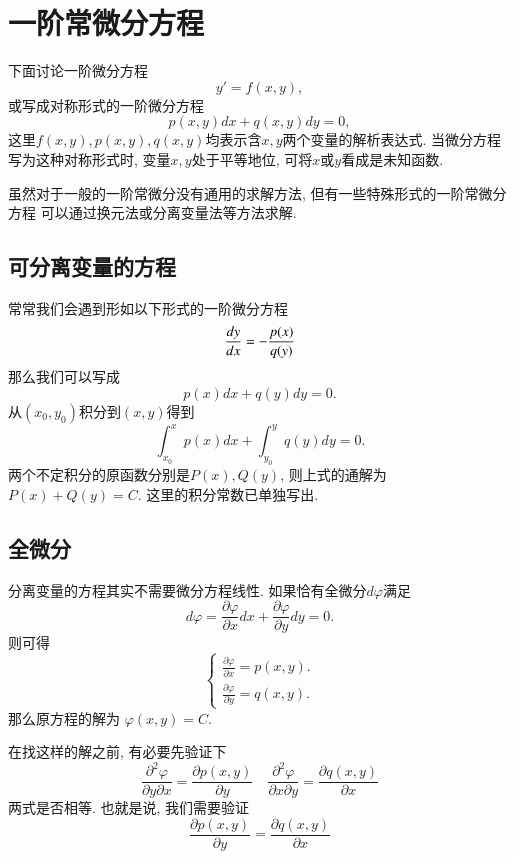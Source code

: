 \section{一阶常微分方程}
下面讨论一阶微分方程
\begin{equation}
    y' = f(x,y),
\end{equation}
或写成对称形式的一阶微分方程
\begin{equation}
    p(x,y) dx + q(x,y) dy = 0,
\end{equation}
这里$f(x,y), p(x,y), q(x,y)$均表示含$x,y$两个变量的解析表达式. 当微分方程写为这种对称形式时,
变量$x,y$处于平等地位, 可将$x$或$y$看成是未知函数.

虽然对于一般的一阶常微分没有通用的求解方法, 但有一些特殊形式的一阶常微分方程
可以通过换元法或分离变量法等方法求解. 

\subsection{可分离变量的方程}
常常我们会遇到形如以下形式的一阶微分方程
\begin{equation}
    \frac{d y}{d x}=-\frac{p(x)}{q(y)} \\
\end{equation}
那么我们可以写成
$$
p(x) d x+q(y) d y=0 . 
$$
从$(x_0, y_0)$积分到$(x, y)$得到
$$
\int_{x_0}^{x} p(x) d x+\int_{y_0}^{y} q(y) d y= 0.
$$
两个不定积分的原函数分别是$P(x), Q(y)$, 则上式的通解为
$P(x) + Q(y) = C$. 这里的积分常数已单独写出.

\subsection{全微分}
分离变量的方程其实不需要微分方程线性.
如果恰有全微分$d \varphi$满足
$$
d \varphi=\frac{\partial \varphi}{\partial x} d x+\frac{\partial \varphi}{\partial y} d y=0 .
$$
则可得
$$
\left\{\begin{array}{l}
\frac{\partial \varphi}{\partial x}=p(x, y) . \\
\frac{\partial \varphi}{\partial y}=q(x, y) .
\end{array}\right.
$$
那么原方程的解为 $\varphi(x, y)=C$.

在找这样的解之前, 有必要先验证下
$$
\frac{\partial^2 \varphi}{\partial y \partial x}=\frac{\partial p(x, y)}{\partial y} \quad \frac{\partial^2 \varphi}{\partial x \partial y}=\frac{\partial q(x, y)}{\partial x}
$$
两式是否相等. 也就是说, 我们需要验证
\begin{equation}    
    \frac{\partial p(x, y)}{\partial y} = \frac{\partial q(x, y)}{\partial x}
\end{equation}


